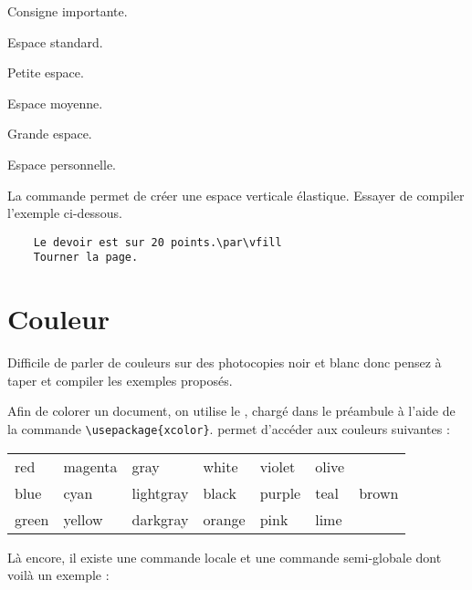 \documentclass[10pt,french]{book}
\begin{document}
{\NewFont
\begin{SideBySideExample}
    Consigne importante.

    Espace standard.\smallskip



    Petite espace.\medskip

    Espace moyenne.\bigskip

    Grande espace.\par\vspace{1cm}
    Espace personnelle.
\end{SideBySideExample}
\bigskip
}

\begin{info}
    La commande  permet de créer une espace verticale élastique. Essayer de compiler l'exemple ci-dessous.
\end{info}

\begin{Verbatim}
    Le devoir est sur 20 points.\par\vfill
    Tourner la page.
\end{Verbatim}

\section{Couleur}

\begin{info}
    Difficile de parler de couleurs sur des photocopies noir et blanc donc pensez à taper et compiler les exemples proposés.
\end{info}



Afin de colorer un document, on utilise le \package {}, chargé dans le préambule à l'aide de la commande \verb!\usepackage{xcolor}!.  permet d'accéder aux couleurs suivantes :
\begin{center}
    \ttfamily
    \begin{tabular}{*{7}{l}}
        red & magenta & gray & white & violet & olive & \\
        blue & cyan  & lightgray & black & purple & teal & brown \\
        green & yellow & darkgray & orange & pink & lime &
    \end{tabular}
\end{center}

Là encore, il existe une commande locale et une commande semi-globale dont voilà un exemple :\medskip
\end{document}
